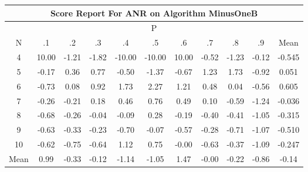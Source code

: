 \documentclass[11pt,a4paper]{report}
\begin{document}
\begin{longtable}{ | c || c | c | c | c | c | c | c | c | c || c |}
\hline
\multicolumn{11}{|c|}{ Score Report For ANR on Algorithm MinusOneB} \\
\hline
\multicolumn{11}{|c|}{ P } \\
\hline
N & .1 & .2 & .3 & .4 & .5 & .6 & .7 & .8 & .9 & Mean\\
 \hline
 \hline
 \endhead
  4 &  \cellcolor[HTML]{0808FF} 10.00 &  \cellcolor[HTML]{FFDFDF} -1.21 &  \cellcolor[HTML]{FFCFCF} -1.82 &  \cellcolor[HTML]{FF0000} -10.00 &  \cellcolor[HTML]{FF0000} -10.00 &  \cellcolor[HTML]{0808FF} 10.00 &  \cellcolor[HTML]{FFEFEF} -0.52 &  \cellcolor[HTML]{FFDFDF} -1.23 &  \cellcolor[HTML]{FFFFFF} -0.12 & -0.545 \\
  5 &  \cellcolor[HTML]{FFF7F7} -0.17 &  \cellcolor[HTML]{F7F7FF} 0.36 &  \cellcolor[HTML]{EFEFFF} 0.77 &  \cellcolor[HTML]{FFEFEF} -0.50 &  \cellcolor[HTML]{FFDFDF} -1.37 &  \cellcolor[HTML]{FFEFEF} -0.67 &  \cellcolor[HTML]{DFDFFF} 1.23 &  \cellcolor[HTML]{D7D7FF} 1.73 &  \cellcolor[HTML]{FFE7E7} -0.92 & 0.051 \\
  6 &  \cellcolor[HTML]{FFEFEF} -0.73 &  \cellcolor[HTML]{FFFFFF} 0.08 &  \cellcolor[HTML]{E7E7FF} 0.92 &  \cellcolor[HTML]{D7D7FF} 1.73 &  \cellcolor[HTML]{C7C7FF} 2.27 &  \cellcolor[HTML]{DFDFFF} 1.21 &  \cellcolor[HTML]{EFEFFF} 0.48 &  \cellcolor[HTML]{FFFFFF} 0.04 &  \cellcolor[HTML]{FFEFEF} -0.56 & 0.605 \\
  7 &  \cellcolor[HTML]{FFF7F7} -0.26 &  \cellcolor[HTML]{FFF7F7} -0.21 &  \cellcolor[HTML]{F7F7FF} 0.18 &  \cellcolor[HTML]{F7F7FF} 0.46 &  \cellcolor[HTML]{EFEFFF} 0.76 &  \cellcolor[HTML]{EFEFFF} 0.49 &  \cellcolor[HTML]{FFFFFF} 0.10 &  \cellcolor[HTML]{FFEFEF} -0.59 &  \cellcolor[HTML]{FFDFDF} -1.24 & -0.036 \\
  8 &  \cellcolor[HTML]{FFEFEF} -0.68 &  \cellcolor[HTML]{FFF7F7} -0.26 &  \cellcolor[HTML]{FFFFFF} -0.04 &  \cellcolor[HTML]{FFFFFF} -0.09 &  \cellcolor[HTML]{F7F7FF} 0.28 &  \cellcolor[HTML]{FFF7F7} -0.19 &  \cellcolor[HTML]{FFF7F7} -0.40 &  \cellcolor[HTML]{FFF7F7} -0.41 &  \cellcolor[HTML]{FFE7E7} -1.05 & -0.315 \\
  9 &  \cellcolor[HTML]{FFEFEF} -0.63 &  \cellcolor[HTML]{FFF7F7} -0.33 &  \cellcolor[HTML]{FFF7F7} -0.23 &  \cellcolor[HTML]{FFEFEF} -0.70 &  \cellcolor[HTML]{FFFFFF} -0.07 &  \cellcolor[HTML]{FFEFEF} -0.57 &  \cellcolor[HTML]{FFF7F7} -0.28 &  \cellcolor[HTML]{FFEFEF} -0.71 &  \cellcolor[HTML]{FFE7E7} -1.07 & -0.510 \\
  10 &  \cellcolor[HTML]{FFEFEF} -0.62 &  \cellcolor[HTML]{FFEFEF} -0.75 &  \cellcolor[HTML]{FFEFEF} -0.64 &  \cellcolor[HTML]{DFDFFF} 1.12 &  \cellcolor[HTML]{EFEFFF} 0.75 &  \cellcolor[HTML]{FFFFFF} -0.00 &  \cellcolor[HTML]{FFEFEF} -0.63 &  \cellcolor[HTML]{FFF7F7} -0.37 &  \cellcolor[HTML]{FFE7E7} -1.09 & -0.247 \\
 \hline
 \hline
Mean &  \cellcolor[HTML]{E7E7FF} 0.99 &  \cellcolor[HTML]{FFF7F7} -0.33 &  \cellcolor[HTML]{FFFFFF} -0.12 &  \cellcolor[HTML]{FFDFDF} -1.14 &  \cellcolor[HTML]{FFE7E7} -1.05 &  \cellcolor[HTML]{D7D7FF} 1.47 &  \cellcolor[HTML]{FFFFFF} -0.00 &  \cellcolor[HTML]{FFF7F7} -0.22 &  \cellcolor[HTML]{FFE7E7} -0.86 &  \cellcolor[HTML]{FFFFFF} -0.14
\end{longtable}
\end{document}
